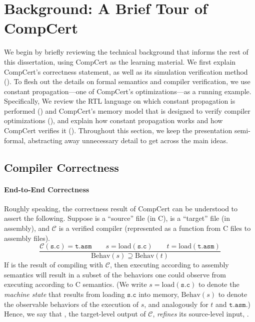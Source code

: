 \section{Background: A Brief Tour of CompCert}
\label{sec:background}

We begin by briefly reviewing the technical background that informs the rest of this dissertation,
using CompCert as the learning material.  We first explain CompCert's correctness statement, as well
as its simulation verification method ().  To flesh out the details
on formal semantics and compiler verification, we use constant propagation---one of CompCert's
optimizations---as a running example.  Specifically, We review the RTL language on which constant
propagation is performed () and CompCert's memory model that is designed to
verify compiler optimizations (), and explain how constant propagation
works and how CompCert verifies it ().  Throughout this section, we
keep the presentation semi-formal, abstracting away unnecessary detail to get across the main ideas.


\subsection{Compiler Correctness}
\label{sec:background:correctness}

\paragraph{End-to-End Correctness}

Roughly speaking, the correctness result of CompCert can be understood to assert the following.
Suppose  is a ``source'' file (in C),  is a ``target'' file (in assembly), and
$\mathcal{C}$ is a verified compiler (represented as a function from C files to assembly files).
\[
\frac{
\mathcal{C}(\mathtt{s.c}) = \mathtt{t.asm} \qquad
s = \mathrm{load}(\mathtt{s.c})\qquad
t = \mathrm{load}(\mathtt{t.asm})}
{\mathrm{Behav}(s) \supseteq \mathrm{Behav}(t)}
\]
If  is the result of compiling  with $\mathcal{C}$, then executing
 according to assembly semantics will result in a subset of the behaviors one could
observe from executing  according to C semantics.  (We write
$s = \mathrm{load}(\mathtt{s.c})$ to denote the \emph{machine state} that results from loading
$\mathtt{s.c}$ into memory, $\mathrm{Behav}(s)$ to denote the observable behaviors of the execution
of $s$, and analogously for $t$ and $\mathtt{t.asm}$.)  Hence, we say that , the
target-level output of $\mathcal{C}$, \emph{refines} its source-level input, .


